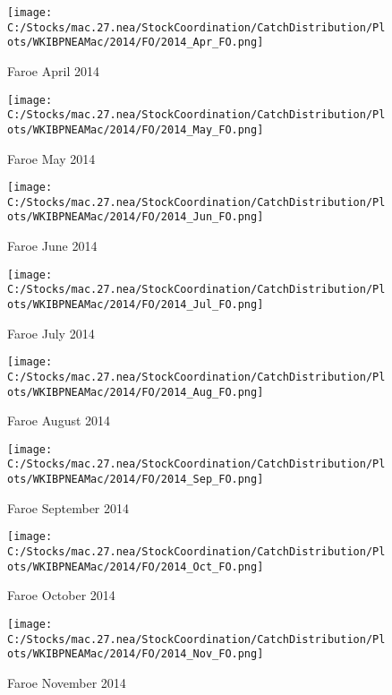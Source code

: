 \documentclass{article}
\begin{document}
\begin{figure}
	\centering
		\texttt{[image: C:/Stocks/mac.27.nea/StockCoordination/CatchDistribution/Plots/WKIBPNEAMac/2014/FO/2014\_Apr\_FO.png]}
	\caption{Faroe April 2014}
	\label{fig:2014_Apr_FO}
\end{figure}

\begin{figure}
	\centering
		\texttt{[image: C:/Stocks/mac.27.nea/StockCoordination/CatchDistribution/Plots/WKIBPNEAMac/2014/FO/2014\_May\_FO.png]}
	\caption{Faroe May 2014}
	\label{fig:2014_May_FO}
\end{figure}

\begin{figure}
	\centering
		\texttt{[image: C:/Stocks/mac.27.nea/StockCoordination/CatchDistribution/Plots/WKIBPNEAMac/2014/FO/2014\_Jun\_FO.png]}
	\caption{Faroe June 2014}
	\label{fig:2014_Jun_FO}
\end{figure}

\begin{figure}
	\centering
		\texttt{[image: C:/Stocks/mac.27.nea/StockCoordination/CatchDistribution/Plots/WKIBPNEAMac/2014/FO/2014\_Jul\_FO.png]}
	\caption{Faroe July 2014}
	\label{fig:2014_Jul_FO}
\end{figure}

\begin{figure}
	\centering
		\texttt{[image: C:/Stocks/mac.27.nea/StockCoordination/CatchDistribution/Plots/WKIBPNEAMac/2014/FO/2014\_Aug\_FO.png]}
	\caption{Faroe August 2014}
	\label{fig:2014_Aug_FO}
\end{figure}

\begin{figure}
	\centering
		\texttt{[image: C:/Stocks/mac.27.nea/StockCoordination/CatchDistribution/Plots/WKIBPNEAMac/2014/FO/2014\_Sep\_FO.png]}
	\caption{Faroe September 2014}
	\label{fig:2014_Sep_FO}
\end{figure}

\begin{figure}
	\centering
		\texttt{[image: C:/Stocks/mac.27.nea/StockCoordination/CatchDistribution/Plots/WKIBPNEAMac/2014/FO/2014\_Oct\_FO.png]}
	\caption{Faroe October 2014}
	\label{fig:2014_Oct_FO}
\end{figure}

\begin{figure}
	\centering
		\texttt{[image: C:/Stocks/mac.27.nea/StockCoordination/CatchDistribution/Plots/WKIBPNEAMac/2014/FO/2014\_Nov\_FO.png]}
	\caption{Faroe November 2014}
	\label{fig:2014_Nov_FO}
\end{figure}
\end{document}
